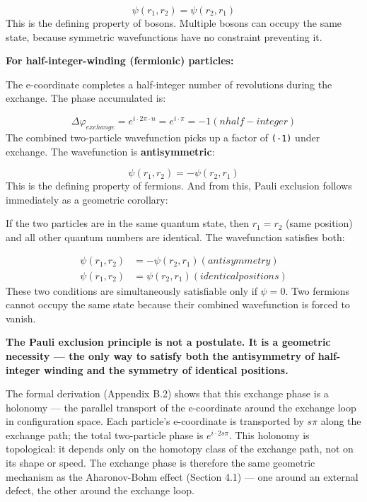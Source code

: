 \documentclass[aps,prd,preprint,superscriptaddress,longbibliography,floatfix]{revtex4-2}
\theoremstyle{remark}
\begin{document}
\begin{equation}
    \psi(r_{1}, r_{2}) = \psi(r_{2}, r_{1})
\end{equation}
This is the defining property of bosons. Multiple bosons can occupy the same state, because symmetric wavefunctions have no constraint preventing it.

\textbf{For half-integer-winding (fermionic) particles:}

The e-coordinate completes a half-integer number of revolutions during the exchange. The phase accumulated is:


\begin{equation}
    \Delta\varphi_{exchange} = e^{i \cdot 2\pi \cdot n} = e^{i \cdot \pi} = -1     (n half-integer)
\end{equation}
The combined two-particle wavefunction picks up a factor of \texttt{(-1)} under exchange. The wavefunction is \textbf{antisymmetric}:


\begin{equation}
    \psi(r_{1}, r_{2}) = -\psi(r_{2}, r_{1})
\end{equation}
This is the defining property of fermions. And from this, Pauli exclusion follows immediately as a geometric corollary:

If the two particles are in the same quantum state, then $r_{1} = r_{2}$ (same position) and all other quantum numbers are identical. The wavefunction satisfies both:


\begin{align}
    \psi(r_{1}, r_{2}) &= -\psi(r_{2}, r_{1})    (antisymmetry) \\
    \psi(r_{1}, r_{2}) &= \psi(r_{2}, r_{1})     (identical positions)
\end{align}
These two conditions are simultaneously satisfiable only if $\psi = 0$. Two fermions cannot occupy the same state because their combined wavefunction is forced to vanish.

\textbf{The Pauli exclusion principle is not a postulate. It is a geometric necessity --- the only way to satisfy both the antisymmetry of half-integer winding and the symmetry of identical positions.}

The formal derivation (Appendix B.2) shows that this exchange phase is a holonomy --- the parallel transport of the e-coordinate around the exchange loop in configuration space. Each particle's e-coordinate is transported by $s\pi$ along the exchange path; the total two-particle phase is $e^{i\cdot2s\pi}$. This holonomy is topological: it depends only on the homotopy class of the exchange path, not on its shape or speed. The exchange phase is therefore the same geometric mechanism as the Aharonov-Bohm effect (Section 4.1) --- one around an external defect, the other around the exchange loop.
\end{document}

